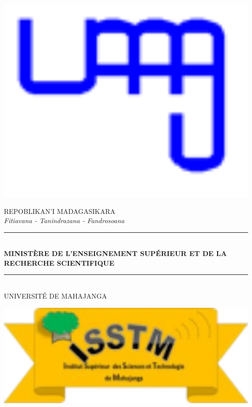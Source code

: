 \documentclass[a4paper, 10pt]{article}
\begin{document}
%
\noindent
\begin{minipage}{0.15\textwidth}
	\includegraphics[width=1\textwidth]{logo_umg.png}
\end{minipage}%
\hfill
\begin{minipage}{0.65\textwidth}
	\begin{center}
		\uppercase{repoblikan'i madagasikara}\\
		\textit{Fitiavana - Tanindrazana - Fandrosoana} \\
		\rule{0.4\textwidth}{0.5pt} \\
		\uppercase{\textbf{ministère de l'enseignement supérieur et de la recherche scientifique}} \\
		\rule{0.4\textwidth}{0.5pt} \\
		\uppercase{université de mahajanga}
	\end{center}
\end{minipage}%
\hfill
\begin{minipage}{0.15\textwidth}
	\includegraphics[width=1\textwidth]{logo_isstm.png}
\end{minipage}\\
\end{document}

